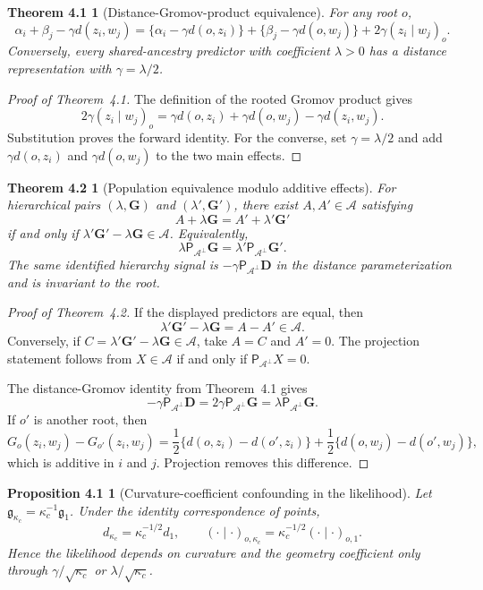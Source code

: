 \documentclass[
  12pt]{article}
\theoremstyle{definition}
\theoremstyle{plain}
\newtheorem*{mainthmequivalence}{Theorem 4.1}
\newtheorem*{mainthmpopulation}{Theorem 4.2}
\newtheorem*{mainpropcurvature}{Proposition 4.1}
\newcommand{\calA}{\mathcal A}
\newcommand{\projA}{\mathsf P_{\calA^\perp}}
\newcommand{\bD}{\mathbf D}
\newcommand{\bG}{\mathbf G}
\begin{document}
\begin{mainthmequivalence}[Distance-Gromov-product equivalence]
	For any root $o$,
	\[
	\alpha_i+\beta_j-\gamma d(z_i,w_j)
	=
	\{\alpha_i-\gamma d(o,z_i)\}
	+
	\{\beta_j-\gamma d(o,w_j)\}
	+
	2\gamma(z_i\mid w_j)_o.
	\]
	Conversely, every shared-ancestry predictor with coefficient $\lambda>0$ has a distance representation with $\gamma=\lambda/2$.
\end{mainthmequivalence}

\begin{proof}[Proof of Theorem~4.1]
	The definition of the rooted Gromov product gives
	\[
	2\gamma(z_i\mid w_j)_o
	=
	\gamma d(o,z_i)+\gamma d(o,w_j)-\gamma d(z_i,w_j).
	\]
	Substitution proves the forward identity. For the converse, set $\gamma=\lambda/2$ and add $\gamma d(o,z_i)$ and $\gamma d(o,w_j)$ to the two main effects.
\end{proof}

\begin{mainthmpopulation}[Population equivalence modulo additive effects]
	For hierarchical pairs $(\lambda,\bG)$ and $(\lambda',\bG')$, there exist $A,A'\in\calA$ satisfying
	\[
	A+\lambda\bG=A'+\lambda'\bG'
	\]
	if and only if $\lambda'\bG'-\lambda\bG\in\calA$. Equivalently,
	\[
	\lambda\projA\bG=\lambda'\projA\bG'.
	\]
	The same identified hierarchy signal is $-\gamma\projA\bD$ in the distance parameterization and is invariant to the root.
\end{mainthmpopulation}

\begin{proof}[Proof of Theorem~4.2]
	If the displayed predictors are equal, then
	\[
	\lambda'\bG'-\lambda\bG=A-A'\in\calA.
	\]
	Conversely, if $C=\lambda'\bG'-\lambda\bG\in\calA$, take $A=C$ and $A'=0$. The projection statement follows from $X\in\calA$ if and only if $\projA X=0$.
	
	The distance-Gromov identity from Theorem~4.1 gives
	\[
	-\gamma\projA\bD=2\gamma\projA\bG=\lambda\projA\bG.
	\]
	If $o'$ is another root, then
	\[
	G_o(z_i,w_j)-G_{o'}(z_i,w_j)
	=
	\frac12\{d(o,z_i)-d(o',z_i)\}
	+
	\frac12\{d(o,w_j)-d(o',w_j)\},
	\]
	which is additive in $i$ and $j$. Projection removes this difference.
\end{proof}

\begin{mainpropcurvature}[Curvature-coefficient confounding in the likelihood]
	Let $\mathfrak g_{\kappa_c}=\kappa_c^{-1}\mathfrak g_1$. Under the identity correspondence of points,
	\[
	d_{\kappa_c}=\kappa_c^{-1/2}d_1,
	\qquad
	(\cdot\mid\cdot)_{o,\kappa_c}=\kappa_c^{-1/2}(\cdot\mid\cdot)_{o,1}.
	\]
	Hence the likelihood depends on curvature and the geometry coefficient only through $\gamma/\sqrt{\kappa_c}$ or $\lambda/\sqrt{\kappa_c}$.
\end{mainpropcurvature}
\end{document}
